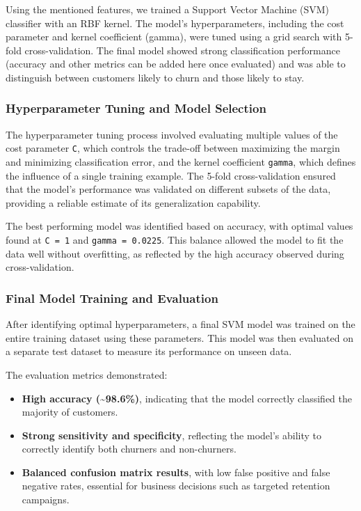 \documentclass[
]{article}
\providecommand{\tightlist}{%
  \setlength{\itemsep}{0pt}\setlength{\parskip}{0pt}}
\begin{document}
Using the mentioned features, we trained a Support Vector Machine (SVM)
classifier with an RBF kernel. The model's hyperparameters, including
the cost parameter and kernel coefficient (gamma), were tuned using a
grid search with 5-fold cross-validation. The final model showed strong
classification performance (accuracy and other metrics can be added here
once evaluated) and was able to distinguish between customers likely to
churn and those likely to stay.

\hypertarget{hyperparameter-tuning-and-model-selection}{%
\subsubsection{Hyperparameter Tuning and Model
Selection}\label{hyperparameter-tuning-and-model-selection}}

The hyperparameter tuning process involved evaluating multiple values of
the cost parameter \texttt{C}, which controls the trade-off between
maximizing the margin and minimizing classification error, and the
kernel coefficient \texttt{gamma}, which defines the influence of a
single training example. The 5-fold cross-validation ensured that the
model's performance was validated on different subsets of the data,
providing a reliable estimate of its generalization capability.

The best performing model was identified based on accuracy, with optimal
values found at \texttt{C\ =\ 1} and \texttt{gamma\ =\ 0.0225}. This
balance allowed the model to fit the data well without overfitting, as
reflected by the high accuracy observed during cross-validation.

\hypertarget{final-model-training-and-evaluation}{%
\subsubsection{Final Model Training and
Evaluation}\label{final-model-training-and-evaluation}}

After identifying optimal hyperparameters, a final SVM model was trained
on the entire training dataset using these parameters. This model was
then evaluated on a separate test dataset to measure its performance on
unseen data.

The evaluation metrics demonstrated:

\begin{itemize}
\tightlist
\item
  \textbf{High accuracy (\textasciitilde98.6\%)}, indicating that the
  model correctly classified the majority of customers.
\item
  \textbf{Strong sensitivity and specificity}, reflecting the model's
  ability to correctly identify both churners and non-churners.
\item
  \textbf{Balanced confusion matrix results}, with low false positive
  and false negative rates, essential for business decisions such as
  targeted retention campaigns.
\end{itemize}
\end{document}
